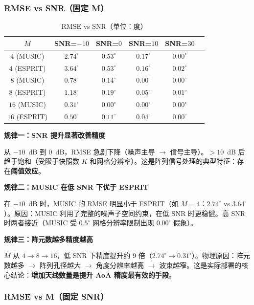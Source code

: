 \documentclass[11pt,a4paper]{article}
\begin{document}
\subsubsection*{RMSE vs SNR（固定 M）}

\begin{table}[H]
\centering
\caption{RMSE vs SNR（单位：度）}
\label{tab:rmse_snr}
\begin{tabular}{cccccc}
\toprule
$M$ & SNR=$-10$ & SNR=$0$ & SNR=$10$ & SNR=$30$ \\
\midrule
$4$ (MUSIC) & $2.74^\circ$ & $0.53^\circ$ & $0.17^\circ$ & $0.00^\circ$ \\
$4$ (ESPRIT) & $3.64^\circ$ & $0.53^\circ$ & $0.16^\circ$ & $0.02^\circ$ \\
$8$ (MUSIC) & $0.78^\circ$ & $0.14^\circ$ & $0.00^\circ$ & $0.00^\circ$ \\
$8$ (ESPRIT) & $1.18^\circ$ & $0.19^\circ$ & $0.05^\circ$ & $0.01^\circ$ \\
$16$ (MUSIC) & $0.31^\circ$ & $0.00^\circ$ & $0.00^\circ$ & $0.00^\circ$ \\
$16$ (ESPRIT) & $0.50^\circ$ & $0.11^\circ$ & $0.04^\circ$ & $0.00^\circ$ \\
\bottomrule
\end{tabular}
\end{table}

\textbf{规律一：SNR 提升显著改善精度}

从 $-10$~dB 到 $0$~dB，RMSE 急剧下降（噪声主导 $\to$ 信号主导）。$>10$~dB 后趋于饱和（受限于快照数 $K$ 和网格分辨率）。这是阵列信号处理的典型特征：存在\textbf{阈值效应}。

\textbf{规律二：MUSIC 在低 SNR 下优于 ESPRIT}

在 $-10$~dB 时，MUSIC 的 RMSE 明显小于 ESPRIT（如 $M=4$：$2.74^\circ$ vs $3.64^\circ$）。原因：MUSIC 利用了完整的噪声子空间约束，在低 SNR 时更稳健。高 SNR 时两者接近（MUSIC 受 $0.5^\circ$ 网格分辨率限制出现 $0.00^\circ$ 假象）。

\textbf{规律三：阵元数越多精度越高}

$M$ 从 $4 \to 8 \to 16$，低 SNR 下精度提升约 9 倍（$2.74^\circ \to 0.31^\circ$）。物理原因：阵元数越多 $\to$ 阵列孔径越大 $\to$ 角度分辨率越高 $\to$ 波束越窄。这是实际部署的核心结论：\textbf{增加天线数量是提升 AoA 精度最有效的手段}。

\subsubsection*{RMSE vs M（固定 SNR）}
\end{document}
